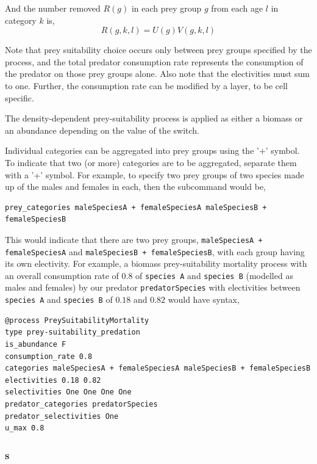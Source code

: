 And the number removed $R(g)$ in each prey group $g$ from each age $l$ in category $k$ is,
\begin{equation}
  R(g,k,l) = U(g)V(g,k,l)
\end{equation}

Note that prey suitability choice occurs only between prey groups specified by the process, and the total predator consumption rate represents the consumption of the predator on those prey groups alone. Also note that the electivities must sum to one. Further, the consumption rate can be modified by a layer, to be cell specific. 

The density-dependent prey-suitability process is applied as either a biomass or an abundance depending on the value of the  switch.

Individual categories can be aggregated into prey groups using the '+' symbol. To indicate that two (or more) categories are to be aggregated, separate them with a '+' symbol. For example, to specify two prey groups of two species made up of the males and females in each, then the subcommand would be,

{\small{\begin{verbatim}
prey_categories maleSpeciesA + femaleSpeciesA maleSpeciesB + femaleSpeciesB
\end{verbatim}}}

This would indicate that there are two prey groups, \texttt{maleSpeciesA + femaleSpeciesA} and \texttt{maleSpeciesB + femaleSpeciesB}, with each group having its own electivity. For example, a biomass prey-suitability mortality process with an overall consumption rate of $0.8$ of \texttt{species A} and \texttt{species B} (modelled as males and females) by our predator \texttt{predatorSpecies} with electivities between \texttt{species A} and \texttt{species B} of $0.18$ and $0.82$ would have syntax,

{\small{\begin{verbatim}
@process PreySuitabilityMortality
type prey-suitability_predation
is_abundance F
consumption_rate 0.8
categories maleSpeciesA + femaleSpeciesA maleSpeciesB + femaleSpeciesB
electivities 0.18 0.82
selectivities One One One One
predator_categories predatorSpecies
predator_selectivities One
u_max 0.8
\end{verbatim}}}

\subsubsection{s}

